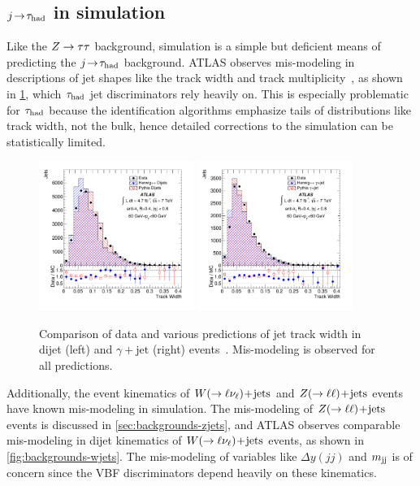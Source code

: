 \subsection{$j\!\rightarrow\!\tau_\text{had}$ in simulation}

Like the $Z\rightarrow\tau\tau$ background, simulation is a simple but deficient means of predicting the $j\!\rightarrow\!\tau_\text{had}$ background. ATLAS observes mis-modeling in descriptions of jet shapes like the track width and track multiplicity~\cite{PERF-2013-02}, as shown in \cref{fig:backgrounds-trackwidth}, which $\tau_\text{had}$ jet discriminators rely heavily on. This is especially problematic for $\tau_\text{had}$ because the identification algorithms emphasize tails of distributions like track width, not the bulk, hence detailed corrections to the simulation can be statistically limited.

\begin{figure}[tp]
  \centering
  \includegraphics[width=0.45\textwidth]{figures/PERF-2013-02/figaux_01c}
  \includegraphics[width=0.45\textwidth]{figures/PERF-2013-02/figaux_02c}
  \caption{Comparison of data and various predictions of jet track width in dijet (left) and $\gamma\!+\!\text{jet}$ (right) events~\cite{PERF-2013-02}. Mis-modeling is observed for all predictions.}
  \label{fig:backgrounds-trackwidth}
\end{figure}

Additionally, the event kinematics of $W (\rightarrow \ell\nu_\ell)\!+\!\text{jets}$ and $Z (\rightarrow \ell\ell)\!+\!\text{jets}$ events have known mis-modeling in simulation. The mis-modeling of $Z (\rightarrow \ell\ell)\!+\!\text{jets}$ events is discussed in \cref{sec:backgrounds-zjets}, and ATLAS observes comparable mis-modeling in dijet kinematics of $W (\rightarrow \ell\nu_\ell)\!+\!\text{jets}$ events, as shown in \cref{fig:backgrounds-wjets}. The mis-modeling of variables like $\Delta y(jj)$ and $m_{\text{jj}}$ is of concern since the VBF discriminators depend heavily on these kinematics.

